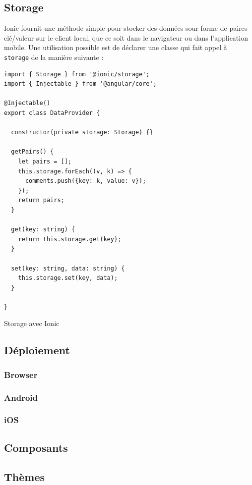 \documentclass[a4paper, 12pt]{article}
\newenvironment{code}{\captionsetup{type=listing}}{}
\begin{document}
\subsection{Storage}
Ionic fournit une méthode simple pour stocker des données sour forme de paires clé/valeur sur le client local, 
que ce soit dans le navigateur ou dans l'application mobile. Une utilisation possible est de déclarer une classe 
qui fait appel à \texttt{storage} de la manière suivante :
\begin{code}
    \begin{verbatim}
import { Storage } from '@ionic/storage';
import { Injectable } from '@angular/core';

@Injectable()
export class DataProvider {

  constructor(private storage: Storage) {}

  getPairs() {
    let pairs = [];
    this.storage.forEach((v, k) => {
      comments.push({key: k, value: v});
    });
    return pairs;
  }

  get(key: string) {
    return this.storage.get(key);
  }
 
  set(key: string, data: string) {
    this.storage.set(key, data);
  }

}
    \end{verbatim}
    \caption{Storage avec Ionic}
\end{code}

\subsection{Déploiement}
\subsubsection{Browser}
\subsubsection{Android}
\subsubsection{iOS}
\subsection{Composants}
\subsection{Thèmes}
\end{document}
